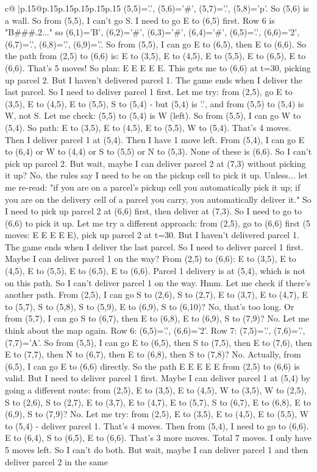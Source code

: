 \documentclass{article}
\begin{document}
{\begin{supertabular}{c@{$\;$}|p{.15\linewidth}@{}p{.15\linewidth}p{.15\linewidth}p{.15\linewidth}p{.15\linewidth}p{.15\linewidth}}
{{{(5,5)='.', (5,6)='\#', (5,7)='.', (5,8)='p'. So (5,6) is a wall. So from (5,5), I can't go S. I need to go E to (6,5) first. Row 6 is "B\#\#\#.2..." so (6,1)='B', (6,2)='\#', (6,3)='\#', (6,4)='\#', (6,5)='.', (6,6)='2', (6,7)='.', (6,8)='.', (6,9)='.'. So from (5,5), I can go E to (6,5), then E to (6,6). So the path from (2,5) to (6,6) is: E to (3,5), E to (4,5), E to (5,5), E to (6,5), E to (6,6). That's 5 moves! So plan: E E E E E. This gets me to (6,6) at t=30, picking up parcel 2. But I haven't delivered parcel 1. The game ends when I deliver the last parcel. So I need to deliver parcel 1 first. Let me try: from (2,5), go E to (3,5), E to (4,5), E to (5,5), S to (5,4) {-} but (5,4) is '.', and from (5,5) to (5,4) is W, not S. Let me check: (5,5) to (5,4) is W (left). So from (5,5), I can go W to (5,4). So path: E to (3,5), E to (4,5), E to (5,5), W to (5,4). That's 4 moves. Then I deliver parcel 1 at (5,4). Then I have 1 move left. From (5,4), I can go E to (6,4) or W to (4,4) or S to (5,5) or N to (5,3). None of these is (6,6). So I can't pick up parcel 2. But wait, maybe I can deliver parcel 2 at (7,3) without picking it up? No, the rules say I need to be on the pickup cell to pick it up. Unless... let me re{-}read: "if you are on a parcel's pickup cell you automatically pick it up; if you are on the delivery cell of a parcel you carry, you automatically deliver it." So I need to pick up parcel 2 at (6,6) first, then deliver at (7,3). So I need to go to (6,6) to pick it up. Let me try a different approach: from (2,5), go to (6,6) first (5 moves: E E E E E), pick up parcel 2 at t=30. But I haven't delivered parcel 1. The game ends when I deliver the last parcel. So I need to deliver parcel 1 first. Maybe I can deliver parcel 1 on the way? From (2,5) to (6,6): E to (3,5), E to (4,5), E to (5,5), E to (6,5), E to (6,6). Parcel 1 delivery is at (5,4), which is not on this path. So I can't deliver parcel 1 on the way. Hmm. Let me check if there's another path. From (2,5), I can go S to (2,6), S to (2,7), E to (3,7), E to (4,7), E to (5,7), S to (5,8), S to (5,9), E to (6,9), S to (6,10)? No, that's too long. Or from (5,7), I can go S to (6,7), then E to (6,8), E to (6,9), S to (7,9)? No. Let me think about the map again. Row 6: (6,5)='.', (6,6)='2'. Row 7: (7,5)='.', (7,6)='.', (7,7)='A'. So from (5,5), I can go E to (6,5), then S to (7,5), then E to (7,6), then E to (7,7), then N to (6,7), then E to (6,8), then S to (7,8)? No. Actually, from (6,5), I can go E to (6,6) directly. So the path E E E E E from (2,5) to (6,6) is valid. But I need to deliver parcel 1 first. Maybe I can deliver parcel 1 at (5,4) by going a different route: from (2,5), E to (3,5), E to (4,5), W to (3,5), W to (2,5), S to (2,6), S to (2,7), E to (3,7), E to (4,7), E to (5,7), S to (6,7), E to (6,8), E to (6,9), S to (7,9)? No. Let me try: from (2,5), E to (3,5), E to (4,5), E to (5,5), W to (5,4) {-} deliver parcel 1. That's 4 moves. Then from (5,4), I need to go to (6,6). E to (6,4), S to (6,5), E to (6,6). That's 3 more moves. Total 7 moves. I only have 5 moves left. So I can't do both. But wait, maybe I can deliver parcel 1 and then deliver parcel 2 in the same }}}
\end{supertabular}}
\end{document}
